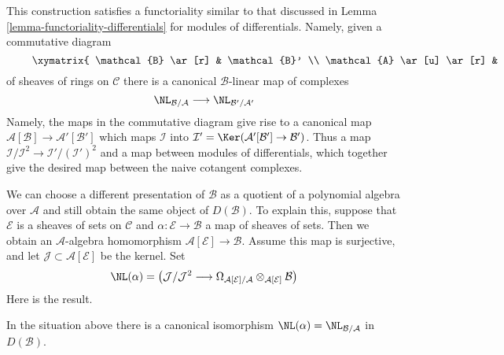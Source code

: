\noindent
This construction satisfies a functoriality similar to that discussed
in Lemma \ref{lemma-functoriality-differentials} for modules of differentials.
Namely, given a commutative diagram
\begin{equation}
\label{equation-commutative-square-sheaves}
\vcenter{
\xymatrix{
\mathcal{B} \ar[r] & \mathcal{B}' \\
\mathcal{A} \ar[u] \ar[r] & \mathcal{A}' \ar[u]
}
}
\end{equation}
of sheaves of rings on $\mathcal{C}$ there is a canonical
$\mathcal{B}$-linear map of complexes
$$
\NL_{\mathcal{B}/\mathcal{A}} \longrightarrow \NL_{\mathcal{B}'/\mathcal{A}'}
$$
Namely, the maps in the commutative diagram give rise to a canonical map
$\mathcal{A}[\mathcal{B}] \to \mathcal{A}'[\mathcal{B}']$
which maps $\mathcal{I}$ into
$\mathcal{I}' = \Ker(\mathcal{A}'[\mathcal{B}'] \to \mathcal{B}')$.
Thus a map $\mathcal{I}/\mathcal{I}^2 \to \mathcal{I}'/(\mathcal{I}')^2$
and a map between modules of differentials, which together give the
desired map between the naive cotangent complexes.

\medskip\noindent
We can choose a different presentation of $\mathcal{B}$ as a quotient of a
polynomial algebra over $\mathcal{A}$ and still obtain the same object
of $D(\mathcal{B})$. To explain this, suppose that $\mathcal{E}$ is
a sheaves of sets on $\mathcal{C}$ and $\alpha : \mathcal{E} \to \mathcal{B}$
a map of sheaves of sets. Then we obtain an $\mathcal{A}$-algebra
homomorphism $\mathcal{A}[\mathcal{E}] \to \mathcal{B}$. Assume this map
is surjective, and let $\mathcal{J} \subset \mathcal{A}[\mathcal{E}]$
be the kernel. Set
$$
\NL(\alpha) = \left(
\mathcal{J}/\mathcal{J}^2
\longrightarrow
\Omega_{\mathcal{A}[\mathcal{E}]/\mathcal{A}}
\otimes_{\mathcal{A}[\mathcal{E}]} \mathcal{B}\right)
$$
Here is the result.

\begin{lemma}
\label{lemma-NL-up-to-qis}
In the situation above there is a canonical isomorphism
$\NL(\alpha) = \NL_{\mathcal{B}/\mathcal{A}}$ in $D(\mathcal{B})$.
\end{lemma}

